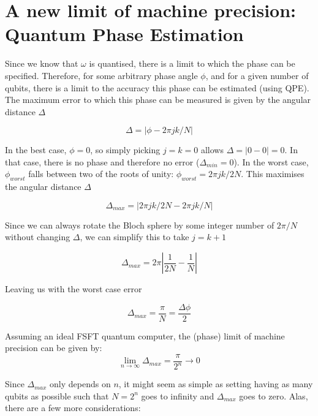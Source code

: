 \documentclass{book}
\begin{document}
\section{A new limit of machine precision: Quantum Phase Estimation}

Since we know that $\omega$ is quantised, there is a limit to which the phase can be specified. Therefore, for some arbitrary phase angle $\phi$, and for a given number of qubits, there is a limit to the accuracy this phase can be estimated (using QPE). The maximum error to which this phase can be measured is given by the angular distance $\Delta$

$$ \Delta = | \phi - 2\pi jk/N | $$

In the best case, $\phi = 0 $, so simply picking $ j = k = 0 $ allows $\Delta = | 0 - 0 | = 0 $. In that case, there is no phase and therefore no error ($\Delta_{min} = 0$). In the worst case, $\phi_{worst}$ falls between two of the roots of unity: $\phi_{worst} = 2\pi jk/2N$. This maximises the angular distance $\Delta$

$$ \Delta_{max} = | 2\pi jk/2N - 2\pi jk/N | $$

Since we can always rotate the Bloch sphere by some integer number of $ 2\pi/N $ without changing $ \Delta $, we can simplify this to take $j = k + 1$

$$ \Delta_{max} = 2\pi \left| \frac{1}{2N} - \frac{1}{N} \right| $$

Leaving us with the worst case error 

$$ \Delta_{max} = \frac{\pi}{N} = \frac{\Delta\phi}{2} $$

Assuming an ideal FSFT quantum computer, the (phase) limit of machine precision can be given by:
$$
\lim_{n \rightarrow \infty} \Delta_{max} = \frac{\pi}{2^n} \rightarrow 0
$$

Since $\Delta_{max}$ only depends on $n$, it might seem as simple as setting having as many qubits as possible such that $N = 2^n$ goes to infinity and $\Delta_{max}$ goes to zero. Alas, there are a few more considerations:
\end{document}
